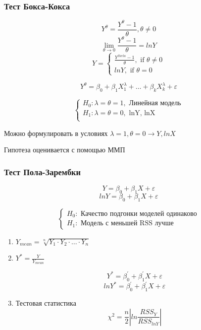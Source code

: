 \documentclass[a4paper, 12pt]{article}
\begin{document}
\subsubsection{Тест Бокса-Кокса}

\[Y^{\theta} = \frac{Y^{\theta} - 1}{\theta}, \theta \neq 0\]
\[\lim_{\theta \to 0}\frac{Y^{\theta} - 1}{\theta} = lnY\]
\[Y = 
\begin{cases}
    \frac{Y^{theta} - 1}{\theta}, \textrm{ if } \theta \neq 0 \\
    lnY, \textrm{ if } \theta = 0    
\end{cases}\]

\[Y^{\theta} = \beta_0 + \beta_1 X_1^{\lambda} + \ldots + \beta_k X_k^{\lambda} + \varepsilon\]

\[
\begin{cases}
    H_0: \lambda = \theta = 1, \textrm{ Линейная модель} \\
    H_1: \lambda = \theta = 0, \textrm{ lnY, lnX} \\    
\end{cases}
\]

Можно формулировать в условиях $\lambda = 1, \theta = 0 \rightarrow Y, lnX$

Гипотеза оценивается с помощью ММП

\subsubsection{Тест Пола-Зарембки}

\[Y = \beta_0 + \beta_1 X + \varepsilon\]
\[lnY = \beta_0 + \beta_1 X + \varepsilon\]

\[
\begin{cases}
    H_0: \textrm{ Качество подгонки моделей одинаково} \\
    H_1: \textrm{ Модель с меньшей RSS лучше}
\end{cases}    
\]

\begin{enumerate}
    \item $Y_{mean} = \sqrt[n]{Y_1 \cdot Y_2 \cdot \ldots \cdot Y_n}$
    \item $Y^{*} = \frac{Y}{Y_{mean}}$
    
    \[Y^* = \beta_{0}^{\prime} + \beta_{1}^{\prime}X + \varepsilon\]
    \[lnY^* = \beta_{0}^{\prime} + \beta_{1}^{\prime}X + \varepsilon\]
    \item Тестовая статистика
    \[\chi^2 = \frac{n}{2}|ln\frac{RSS_{Y}}{RSS_{lnY}}|\]
\end{enumerate}
\end{document}
